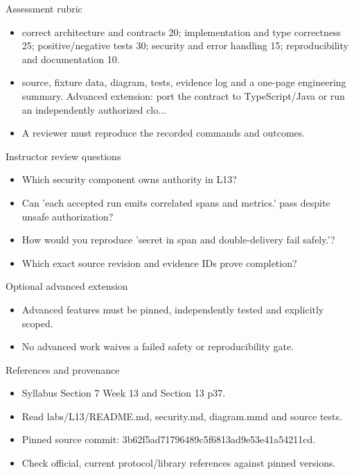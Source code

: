 \documentclass[aspectratio=169,10pt]{beamer}
\begin{document}
\begin{frame}{Assessment rubric}
\small
\begin{itemize}
\item correct architecture and contracts 20; implementation and type correctness 25; positive/negative tests 30; security and error handling 15; reproducibility and documentation 10.
\item source, fixture data, diagram, tests, evidence log and a one-page engineering summary. Advanced extension: port the contract to TypeScript/Java or run an independently authorized clo...
\item A reviewer must reproduce the recorded commands and outcomes.
\end{itemize}

\end{frame}

\begin{frame}{Instructor review questions}
\small
\begin{itemize}
\item Which security component owns authority in L13?
\item Can 'each accepted run emits correlated spans and metrics.' pass despite unsafe authorization?
\item How would you reproduce 'secret in span and double-delivery fail safely.'?
\item Which exact source revision and evidence IDs prove completion?
\end{itemize}

\end{frame}

\begin{frame}{Optional advanced extension}
\small
\begin{itemize}
\item Advanced features must be pinned, independently tested and explicitly scoped.
\item No advanced work waives a failed safety or reproducibility gate.
\end{itemize}

\end{frame}

\begin{frame}{References and provenance}
\small
\begin{itemize}
\item Syllabus Section 7 Week 13 and Section 13 p37.
\item Read labs/L13/README.md, security.md, diagram.mmd and source tests.
\item Pinned source commit: 3b62f5ad71796489c5f6813ad9e53e41a54211cd.
\item Check official, current protocol/library references against pinned versions.
\end{itemize}

\end{frame}
\end{document}

